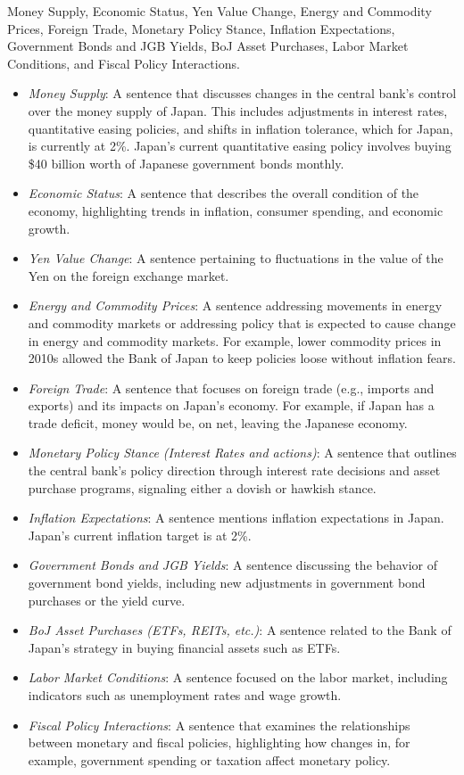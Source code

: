  Money Supply, Economic Status, Yen Value Change, Energy and Commodity Prices, Foreign Trade, Monetary Policy Stance, Inflation Expectations, Government Bonds and JGB Yields, BoJ Asset Purchases, Labor Market Conditions, and Fiscal Policy Interactions.


\begin{itemize}
    \item \emph{Money Supply}: A sentence that discusses changes in the central bank's control over the money supply of Japan. This includes adjustments in interest rates, quantitative easing policies, and shifts in inflation tolerance, which for Japan, is currently at 2\%. Japan's current quantitative easing policy involves buying \$40 billion worth of Japanese government bonds monthly.
    \item \emph{Economic Status}: A sentence that describes the overall condition of the economy, highlighting trends in inflation, consumer spending, and economic growth. 
    \item \emph{Yen Value Change}: A sentence pertaining to fluctuations in the value of the Yen on the foreign exchange market.
    \item \emph{Energy and Commodity Prices}: A sentence addressing movements in energy and commodity markets or addressing policy that is expected to cause change in energy and commodity markets. For example, lower commodity prices in 2010s allowed the Bank of Japan to keep policies loose without inflation fears.
    \item \emph{Foreign Trade}: A sentence that focuses on foreign trade (e.g., imports and exports) and its impacts on Japan's economy. For example, if Japan has a trade deficit, money would be, on net, leaving the Japanese economy. 
    \item \emph{Monetary Policy Stance (Interest Rates and actions)}: A sentence that outlines the central bank's policy direction through interest rate decisions and asset purchase programs, signaling either a dovish or hawkish stance.
    \item \emph{Inflation Expectations}: A sentence mentions inflation expectations in Japan. Japan's current inflation target is at 2\%.
    \item \emph{Government Bonds and JGB Yields}: A sentence discussing the behavior of government bond yields, including new adjustments in government bond purchases or the yield curve.
    \item \emph{BoJ Asset Purchases (ETFs, REITs, etc.)}: A sentence related to the Bank of Japan's strategy in buying financial assets such as ETFs.
    \item \emph{Labor Market Conditions}: A sentence focused on the labor market, including indicators such as unemployment rates and wage growth.
    \item \emph{Fiscal Policy Interactions}: A sentence that examines the relationships between monetary and fiscal policies, highlighting how changes in, for example,  government spending or taxation affect monetary policy.
\end{itemize}

